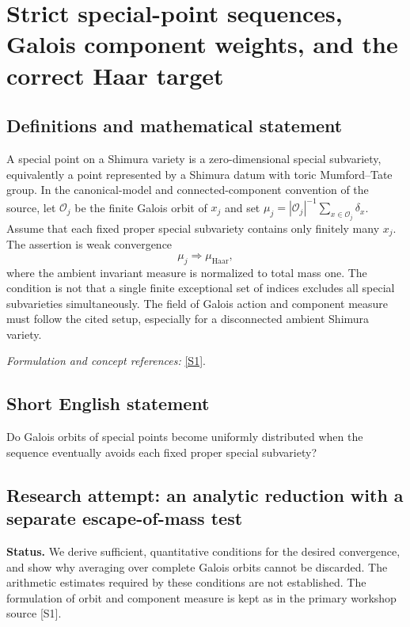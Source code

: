 \documentclass[11pt]{article}
\begin{document}
\section*{\texorpdfstring{Strict special-point sequences, Galois component weights, and the correct Haar target}{Strict special-point sequences, Galois component weights, and the correct Haar target}}\label{20003353}
\subsection{Definitions and mathematical statement}
A special point on a Shimura variety is a zero-dimensional special subvariety, equivalently a point represented by a Shimura datum with toric Mumford--Tate group. In the canonical-model and connected-component convention of the source, let $\mathcal O_j$ be the finite Galois orbit of $x_j$ and set
$\mu_j=|\mathcal O_j|^{-1}\sum_{x\in\mathcal O_j}\delta_x$. Assume that each fixed proper special subvariety contains only finitely many $x_j$. The assertion is weak convergence
\[
 \mu_j\Longrightarrow\mu_{\mathrm{Haar}},
\]
where the ambient invariant measure is normalized to total mass one. The condition is not that a single finite exceptional set of indices excludes all special subvarieties simultaneously. The field of Galois action and component measure must follow the cited setup, especially for a disconnected ambient Shimura variety.
\par\smallskip\textit{Formulation and concept references:} \href{https://aimath.org/WWN/measrigid/measrigid.pdf}{[S1]}.

\subsection{Short English statement}
Do Galois orbits of special points become uniformly distributed when the sequence eventually avoids each fixed proper special subvariety?
\subsection{Research attempt: an analytic reduction with a separate escape-of-mass test}
\textbf{Status.} We derive sufficient, quantitative conditions for the desired convergence, and show why averaging over complete Galois orbits cannot be discarded. The arithmetic estimates required by these conditions are not established. The formulation of orbit and component measure is kept as in the primary workshop source [S1].
\end{document}
